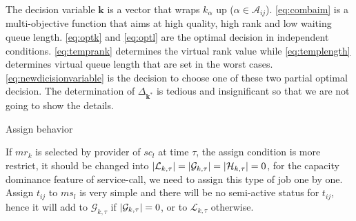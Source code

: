 \begin{asparaenum}


The decision variable $\bm{k}$ is a vector that wraps $k_\alpha$ up ($\alpha\in\mathcal{A}_{ij}$). 
\autoref{eq:combaim} is a multi-objective function that aims at high quality, high rank and low waiting queue length. \autoref{eq:optk} and \autoref{eq:optl} are the optimal decision in independent conditions. \autoref{eq:temprank} determines the virtual rank value while \autoref{eq:templength} determines virtual queue length that are set in the worst cases.
\autoref{eq:newdicisionvariable} is the decision to choose one of these two partial optimal decision. The determination of $\Delta_{\bm{k}^*}$ is tedious and insignificant so that we are not going to show the details. 


\item Assign behavior
\end{asparaenum}
If $mr_k$ is selected by provider of $sc_l$ at time $\tau$, the assign condition is more restrict, it should be changed into $\left|\mathcal{L}_{k,\tau}\right| = \left|\mathcal{G}_{k,\tau}\right| = \left|\mathcal{H}_{k,\tau}\right| = 0$, for the capacity dominance feature of service-call, we need to assign this type of job one by one. Assign $t_{ij}$ to $ms_l$ is very simple and there will be no semi-active status for $t_{ij}$, hence it will add to $\mathcal{G}_{k,\tau}$ if $\left|\mathcal{G}_{k,\tau}\right|=0$, or to $\mathcal{L}_{k,\tau}$ otherwise.

